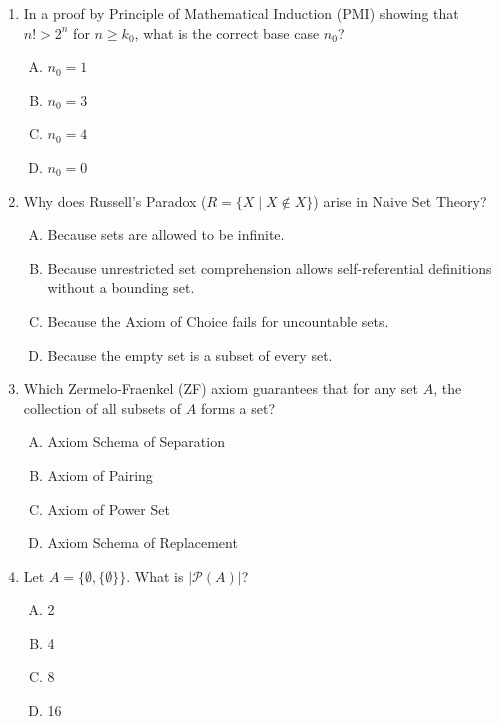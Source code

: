 \documentclass[12pt]{article}
\begin{document}
\begin{enumerate}[1.]
        \item{In a proof by Principle of Mathematical Induction (PMI) showing that $n! > 2^n$ for $n \ge k_0$, what is the correct base case $n_0$?}
            \begin{enumerate}[A.]
                \item{$n_0 = 1$}
                \item{$n_0 = 3$}
                \item{$n_0 = 4$}
                \item{$n_0 = 0$}
            \end{enumerate}
            
        \item{Why does Russell's Paradox ($R = \{X \mid X \notin X\}$) arise in Naive Set Theory?}
            \begin{enumerate}[A.]
                \item{Because sets are allowed to be infinite.}
                \item{Because unrestricted set comprehension allows self-referential definitions without a bounding set.}
                \item{Because the Axiom of Choice fails for uncountable sets.}
                \item{Because the empty set is a subset of every set.}
            \end{enumerate}
            
        \item{Which Zermelo-Fraenkel (ZF) axiom guarantees that for any set $A$, the collection of all subsets of $A$ forms a set?}
            \begin{enumerate}[A.]
                \item{Axiom Schema of Separation}
                \item{Axiom of Pairing}
                \item{Axiom of Power Set}
                \item{Axiom Schema of Replacement}
            \end{enumerate}
            
        \item{Let $A = \{ \emptyset, \{\emptyset\} \}$. What is $|\mathcal{P}(A)|$?}
            \begin{enumerate}[A.]
                \item{2}
                \item{4}
                \item{8}
                \item{16}
            \end{enumerate}
            

\end{enumerate}
\end{document}
